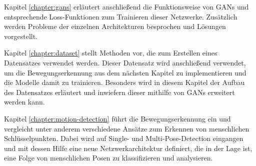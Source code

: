 Kapitel \ref{chapter:gans} erläutert anschließend die Funktionsweise von GANs
und entsprechende Loss-Funktionen zum Trainieren dieser Netzwerke. Zusätzlich
werden Probleme der einzelnen Architekturen besprochen und Lösungen vorgestellt.

Kapitel \ref{chapter:dataset} stellt Methoden vor, die zum Erstellen eines
Datensatzes verwendet werden. Dieser Datensatz wird anschließend verwendet, um
die Bewegungserkennung aus dem nächsten Kapitel zu implementieren und die
Modelle damit zu trainieren. Besonders wird in diesem Kapitel der Aufbau des
Datensatzes erläutert und inwiefern dieser mithilfe von GANs erweitert werden
kann.

Kapitel \ref{chapter:motion-detection} führt die Bewegungserkennung ein und
vergleicht unter anderem verschiedene Ansätze zum Erkennen von menschlichen
Schlüsselpunkten. Dabei wird auf Single- und Multi-Pose-Detection eingangen und
mit dessen Hilfe eine neue Netzwerkarchitektur definiert, die in der Lage ist,
eine Folge von menschlichen Posen zu klassifizieren und analysieren.